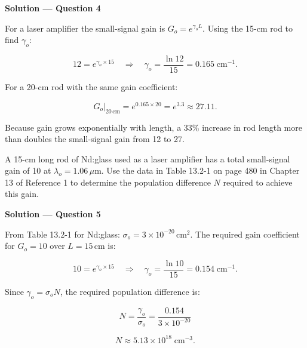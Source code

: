 \textbf{\large Solution --- Question 4}

For a laser amplifier the small-signal gain is $G_o = e^{\gamma_o L}$. Using the 15-cm rod to find $\gamma_o$:

\begin{equation*}
  12 = e^{\gamma_o\times15} \quad\Longrightarrow\quad \gamma_o = \frac{\ln 12}{15} = 0.165\;\text{cm}^{-1}.
\end{equation*}

For a 20-cm rod with the same gain coefficient:

\begin{equation*}
  \boxed{G_o\big|_{20\,\text{cm}} = e^{0.165\times20} = e^{3.3} \approx 27.11.}
\end{equation*}

Because gain grows exponentially with length, a 33\% increase in rod length more than doubles the small-signal gain from 12 to 27.


\begin{question}[Question 5]A 15-cm long rod of Nd:glass used as a laser amplifier has a total
small-signal gain of 10 at $\lambda_{o}=1.06\,\mu$m. Use the data in Table 13.2-1 on page 480
in Chapter 13 of Reference 1 to determine the population difference $N$ required to achieve
this gain.
\end{question}

\textbf{\large Solution --- Question 5}

From Table 13.2-1 for Nd:glass: $\sigma_o = 3\times10^{-20}$\,cm$^{2}$. The required gain coefficient for $G_o=10$ over $L=15$\,cm is:

\begin{equation*}
  10 = e^{\gamma_o\times15} \quad\Longrightarrow\quad
  \gamma_o = \frac{\ln 10}{15} = 0.154\;\text{cm}^{-1}.
\end{equation*}

Since $\gamma_o = \sigma_o N$, the required population difference is:

\begin{equation*}
  N = \frac{\gamma_o}{\sigma_o} = \frac{0.154}{3\times10^{-20}}
\end{equation*}

\begin{equation*}
  \boxed{N \approx 5.13\times10^{18}\;\text{cm}^{-3}.}
\end{equation*}


